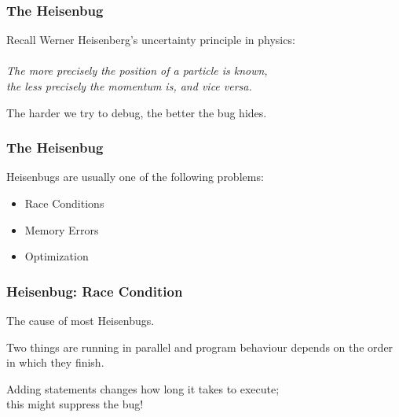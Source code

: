 \begin{frame}
\frametitle{The Heisenbug}
\begin{changemargin}{1cm}

Recall Werner Heisenberg's uncertainty principle in physics:\\~\\
\quad \textit{The more precisely the position of a particle is known,\\
\quad the less precisely the momentum is, and vice versa.}

The harder we try to debug, the better the bug hides. 

\end{changemargin}
\end{frame}

\begin{frame}
\frametitle{The Heisenbug}
\begin{changemargin}{1cm}

Heisenbugs are usually one of the following problems:

\begin{itemize}
	\item Race Conditions
	\item Memory Errors
	\item Optimization
\end{itemize}

\end{changemargin}
\end{frame}

\begin{frame}
\frametitle{Heisenbug: Race Condition}
\begin{changemargin}{1cm}

The cause of most Heisenbugs.

Two things are running in parallel and program behaviour depends on the order in which they finish.

Adding statements changes how long it takes to execute; \\
\quad this might suppress the bug!

\end{changemargin}
\end{frame}

